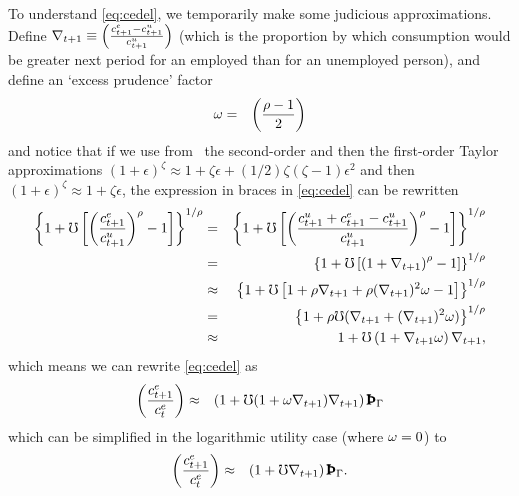 \documentclass{handout}
\begin{document}


To understand \eqref{eq:cedel}, we temporarily make some judicious
approximations.  Define $\nabla _{t+1} \equiv
\left(\frac{c^{e}_{t+1}-c^{u}_{t+1}}{c^{u}_{t+1}}\right)$ (which is
the proportion by which consumption would
be greater next period for an employed than for an 
unemployed person), and define an `excess prudence' factor
\begin{eqnarray}
  \omega & = & \left(\frac{\rho-1}{2}\right)
\end{eqnarray}
and notice that if we use from \MathFactsList ~the second-order and then the first-order
Taylor approximations  \TaylorTwo $(1+\epsilon)^{\zeta} \approx 1 + \zeta \epsilon +
(1/2)\zeta(\zeta-1) \epsilon^{2}$ and then \TaylorOne $(1+\epsilon)^{\zeta} \approx 1 + \zeta \epsilon$, the expression in braces
in \eqref{eq:cedel} can be rewritten
\begin{eqnarray}
        \left\{1+\mho\left[\left(\frac{c^{e}_{t+1}}{c^{u}_{t+1}}\right)^{\rho}-1\right]\right\}^{1/\rho} & = & \left\{1+\mho\left[\left(\frac{c^{u}_{t+1}+c^{e}_{t+1}-c^{u}_{t+1}}{c^{u}_{t+1}}\right)^{\rho}-1\right]\right\}^{1/\rho} \notag
\\      & = & \left\{1+\mho\left[\left(1+\nabla _{t+1}\right)^{\rho}-1\right]\right\}^{1/\rho} \notag
\\      & \approx &      \left\{1+\mho\left[1+\rho \nabla _{t+1}+ \rho (\nabla _{t+1})^{2}\omega-1\right]\right\}^{1/\rho} \notag 
\\ & = &         \left\{1+ \rho \mho (\nabla _{t+1}+ (\nabla _{t+1})^{2}\omega)\right\}^{1/\rho} \notag
\\ & \approx & 1+ \mho  \left(1+\nabla _{t+1}\omega\right)\nabla _{t+1}, \notag
\end{eqnarray}
which means we can rewrite \eqref{eq:cedel} as
\begin{eqnarray}
         \left(\frac{\cRatE_{t+1}}{\cRatE_{t}}\right) & \approx & \left(1+ \urate (1+\prudEx\nabla _{t+1})\nabla _{t+1}\right) {\PatPGro}
         \label{eq:cedelapprox}
\end{eqnarray}
which can be simplified in the logarithmic utility case (where $\omega = 0$) to
\begin{eqnarray}
         \left(\frac{\cRatE_{t+1}}{\cRatE_{t}}\right) & \approx & \left(1+ \urate \nabla _{t+1}\right) {\PatPGro} \label{eq:cedelapproxLog}. 
\end{eqnarray}
\end{document}
